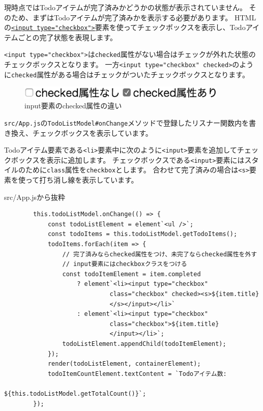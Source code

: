 現時点ではTodoアイテムが完了済みかどうかの状態が表示されていません。
そのため、まずはTodoアイテムが完了済みかを表示する必要があります。
HTMLの\href{https://developer.mozilla.org/ja/docs/Web/HTML/Element/Input/checkbox}{\texttt{<input type="checkbox">}}要素を使ってチェックボックスを表示し、Todoアイテムごとの完了状態を表現します。

\texttt{<input type="checkbox">}は\texttt{checked}属性がない場合はチェックが外れた状態のチェックボックスとなります。
一方\texttt{<input type="checkbox" checked>}のように\texttt{checked}属性がある場合はチェックがついたチェックボックスとなります。

\begin{figure}[h]
\centering
\includegraphics[width=100mm]{./fig/input-checkbox.eps}
\caption{input要素のchecked属性の違い}
\end{figure}

\texttt{src/App.js}の\texttt{TodoListModel\#onChange}メソッドで登録したリスナー関数内を書き換え、チェックボックスを表示しています。

Todoアイテム要素である\texttt{<li>}要素中に次のように\texttt{<input>}要素を追加してチェックボックスを表示に追加します。
チェックボックスである\texttt{<input>}要素にはスタイルのために\texttt{class}属性を\texttt{checkbox}とします。
合わせて完了済みの場合は\texttt{<s>}要素を使って打ち消し線を表示しています。

\begin{listtitle}
src/App.jsから抜粋
\end{listtitle}
\begin{lstlisting}
        this.todoListModel.onChange(() => {
            const todoListElement = element`<ul />`;
            const todoItems = this.todoListModel.getTodoItems();
            todoItems.forEach(item => {
                // 完了済みならchecked属性をつけ、未完了ならchecked属性を外す
                // input要素にはcheckboxクラスをつける
                const todoItemElement = item.completed
                    ? element`<li><input type="checkbox" 
                             class="checkbox" checked><s>${item.title}
                             </s></input></li>`
                    : element`<li><input type="checkbox" 
                             class="checkbox">${item.title}
                             </input></li>`;
                todoListElement.appendChild(todoItemElement);
            });
            render(todoListElement, containerElement);
            todoItemCountElement.textContent = `Todoアイテム数: 
                                     ${this.todoListModel.getTotalCount()}`;
        });
\end{lstlisting}
\listend

